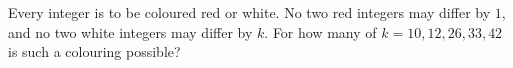 Every integer is to be coloured red or white. No two red integers may differ by $1$, and no two white integers may differ by $k$. For how many of $k=10,12,26,33,42$ is such a colouring possible?
